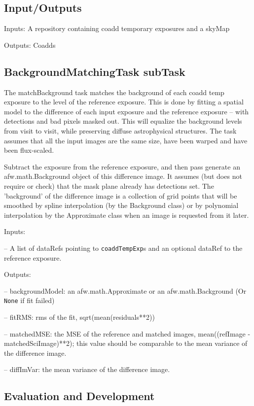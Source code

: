 \documentclass[12pt]{article}
\begin{document}
\subsection{Input/Outputs}

Inputs: A repository containing coadd temporary exposures and a skyMap

Outputs: Coadds

\subsection{BackgroundMatchingTask subTask} 
The matchBackground task matches the background of each coadd temp exposure to the level of the reference exposure.   This is done by fitting a spatial model to the difference of each input exposure and the reference exposure -- with detections and bad pixels masked out.  This will equalize the background levels from visit to visit, while preserving diffuse astrophysical structures.  The task assumes that all the input images are the same size, have been warped and have been flux-scaled. 

Subtract the exposure from the reference exposure, and then pass generate an afw.math.Background object of this difference image. It assumes (but does not require or check) that the mask plane already has detections set.  The 'background' of the difference image is a collection of grid points that will be smoothed by spline interpolation (by the Background class)  or by polynomial interpolation by the Approximate class when an image is requested from it later. 

Inputs: 

-- A list of dataRefs  pointing to {\tt coaddTempExp}s and an optional dataRef to the reference exposure. 

Outputs:  

-- backgroundModel: an afw.math.Approximate or an afw.math.Background (Or {\tt None} if fit failed) 

-- fitRMS: rms of the fit, sqrt(mean(residuals**2))

-- matchedMSE: the MSE of the reference and matched images, mean((refImage - matchedSciImage)**2); 
   this value should be comparable to the mean variance of the difference image.

-- diffImVar: the mean variance of the difference image.

\subsection{Evaluation and Development}
\end{document}
